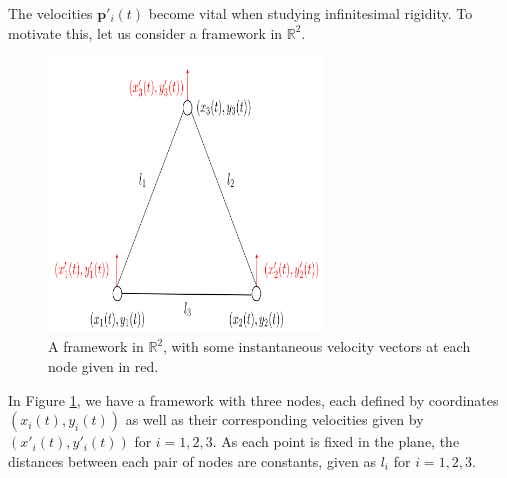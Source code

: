 \begin{flushleft}
The velocities $\mathbf{p}'_i(t)$ become vital when studying infinitesimal rigidity. To motivate this, let us consider a framework in $\mathbb{R}^2$.

\begin{figure}[htbp]
    \centering
    \includegraphics[width = 0.65\textwidth]{Chapter 2/13. inf_rigid_proof.png}
    \caption{A framework in $\mathbb{R}^2$, with some instantaneous velocity vectors at each node given in red.}
    \label{fig: inf_velocity}
\end{figure}

In Figure \ref{fig: inf_velocity}, we have a framework with three nodes, each defined by coordinates $(x_i(t), y_i(t))$ as well as their corresponding velocities given by $(x'_i(t), y'_i(t))$ for $i = 1,2,3$. As each point is fixed in the plane, the distances between each pair of nodes are constants, given as $l_i$ for $i = 1,2,3$.
\end{flushleft}

